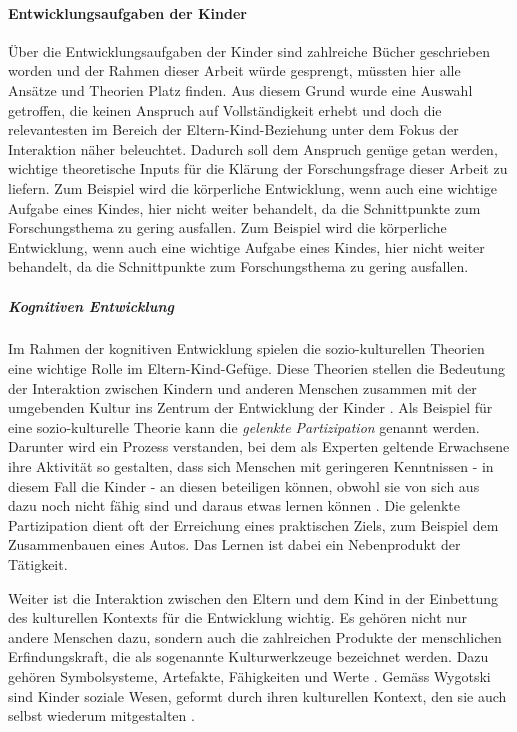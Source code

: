\paragraph{Entwicklungsaufgaben der Kinder}\label{sec:Entwicklungsaufgaben} Über die Entwicklungsaufgaben der Kinder sind zahlreiche Bücher geschrieben worden und der Rahmen dieser Arbeit würde gesprengt, müssten hier alle Ansätze und Theorien Platz finden. Aus diesem Grund wurde eine Auswahl getroffen, die keinen Anspruch auf Vollständigkeit erhebt und doch die relevantesten im Bereich der Eltern-Kind-Beziehung unter dem Fokus der Interaktion näher beleuchtet. Dadurch soll dem Anspruch genüge getan werden, wichtige theoretische Inputs für die Klärung der Forschungsfrage dieser Arbeit zu liefern. Zum Beispiel wird die körperliche Entwicklung, wenn auch eine wichtige Aufgabe eines Kindes, hier nicht weiter behandelt, da die Schnittpunkte zum Forschungsthema zu gering ausfallen. Zum Beispiel wird die körperliche Entwicklung, wenn auch eine wichtige Aufgabe eines Kindes, hier nicht weiter behandelt, da die Schnittpunkte zum Forschungsthema zu gering ausfallen.

\subparagraph{Kognitiven Entwicklung}\label{par:KognitiveEntwicklung}
Im Rahmen der kognitiven Entwicklung spielen die sozio-kulturellen Theorien eine wichtige Rolle im Eltern-Kind-Gefüge. Diese Theorien stellen die Bedeutung der Interaktion zwischen Kindern und anderen Menschen zusammen mit der umgebenden Kultur ins Zentrum der Entwicklung der Kinder \cite[S.~225 ff.]{Siegler2008}. Als Beispiel für eine sozio-kulturelle Theorie kann die \textit{gelenkte Partizipation} genannt werden. Darunter wird ein Prozess verstanden, bei dem als Experten geltende Erwachsene ihre Aktivität so gestalten, dass sich Menschen mit geringeren Kenntnissen - in diesem Fall die Kinder - an diesen beteiligen können, obwohl sie von sich aus dazu noch nicht fähig sind und daraus etwas lernen können \cite{Rogoff1990}. Die gelenkte Partizipation dient oft der Erreichung eines praktischen Ziels, zum Beispiel dem Zusammenbauen eines Autos. Das Lernen ist dabei ein Nebenprodukt der Tätigkeit.

Weiter ist die Interaktion zwischen den Eltern und dem Kind in der Einbettung des kulturellen Kontexts für die Entwicklung wichtig. Es gehören nicht nur andere Menschen dazu, sondern auch die zahlreichen Produkte der menschlichen Erfindungskraft, die als sogenannte Kulturwerkzeuge bezeichnet werden. Dazu gehören Symbolsysteme, Artefakte, Fähigkeiten und Werte \cite[S.~226]{Siegler2008}. Gemäss Wygotski sind Kinder soziale Wesen, geformt durch ihren kulturellen Kontext, den sie auch selbst wiederum mitgestalten \cite[S.~227]{Siegler2008}. 

